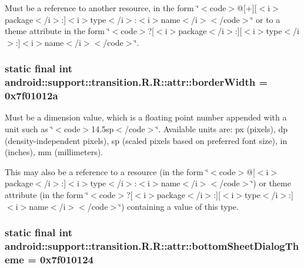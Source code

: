 Must be a reference to another resource, in the form \char`\"{}$<$code$>$@\mbox{[}+\mbox{]}\mbox{[}$<$i$>$package$<$/i$>$:\mbox{]}$<$i$>$type$<$/i$>$:$<$i$>$name$<$/i$>$$<$/code$>$\char`\"{} or to a theme attribute in the form \char`\"{}$<$code$>$?\mbox{[}$<$i$>$package$<$/i$>$:\mbox{]}\mbox{[}$<$i$>$type$<$/i$>$:\mbox{]}$<$i$>$name$<$/i$>$$<$/code$>$\char`\"{}. \hypertarget{classandroid_1_1support_1_1transition_1_1_r_1_1attr_297ef325188026de468694931a2f9590}{
\subsubsection[{borderWidth}]{\setlength{\rightskip}{0pt plus 5cm}static final int android::support::transition.R.R::attr::borderWidth = 0x7f01012a}}
\label{classandroid_1_1support_1_1transition_1_1_r_1_1attr_297ef325188026de468694931a2f9590}


Must be a dimension value, which is a floating point number appended with a unit such as \char`\"{}$<$code$>$14.5sp$<$/code$>$\char`\"{}. Available units are: px (pixels), dp (density-independent pixels), sp (scaled pixels based on preferred font size), in (inches), mm (millimeters). 

This may also be a reference to a resource (in the form \char`\"{}$<$code$>$@\mbox{[}$<$i$>$package$<$/i$>$:\mbox{]}$<$i$>$type$<$/i$>$:$<$i$>$name$<$/i$>$$<$/code$>$\char`\"{}) or theme attribute (in the form \char`\"{}$<$code$>$?\mbox{[}$<$i$>$package$<$/i$>$:\mbox{]}\mbox{[}$<$i$>$type$<$/i$>$:\mbox{]}$<$i$>$name$<$/i$>$$<$/code$>$\char`\"{}) containing a value of this type. \hypertarget{classandroid_1_1support_1_1transition_1_1_r_1_1attr_e2cc70aa4ce7d52b1d818cac6fd10edb}{
\subsubsection[{bottomSheetDialogTheme}]{\setlength{\rightskip}{0pt plus 5cm}static final int android::support::transition.R.R::attr::bottomSheetDialogTheme = 0x7f010124}}
\label{classandroid_1_1support_1_1transition_1_1_r_1_1attr_e2cc70aa4ce7d52b1d818cac6fd10edb}


